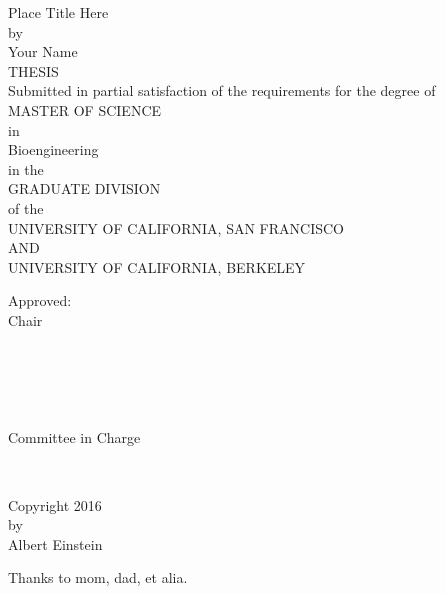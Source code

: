 \documentclass{uscf}
\begin{document}
\frontmatter

\thispagestyle{empty}
\begin{centering}
  Place Title Here\\
  by\\Your Name\\
  THESIS\\Submitted in partial satisfaction of the requirements
  for the degree of\\MASTER OF SCIENCE\\
  in\\Bioengineering\\
  in the\\GRADUATE DIVISION\\
  of the\\UNIVERSITY OF CALIFORNIA, SAN FRANCISCO\\
          AND\\UNIVERSITY OF CALIFORNIA, BERKELEY\\
  \vspace{1in}
  \begin{minipage}{0.7\linewidth}
    \hspace{-2em}Approved:\\
    \null\hfill Chair\\[-.5em]
    \null\dotfill\\
    \null\dotfill\\
    \null\dotfill\\
    \null\dotfill\\[1em]
    \null\dotfill\\
    \null\hfill Committee in Charge\\
  \end{minipage}\\
\end{centering}

\clearpage
\vspace*{2in}
\begin{centering}
  Copyright 2016\\by\\Albert Einstein\\
\end{centering}

\clearpage
\vspace*{1in}
\hfill
\begin{minipage}{.5\linewidth}
  Thanks to mom, dad, et alia.
\end{minipage}
\end{document}
